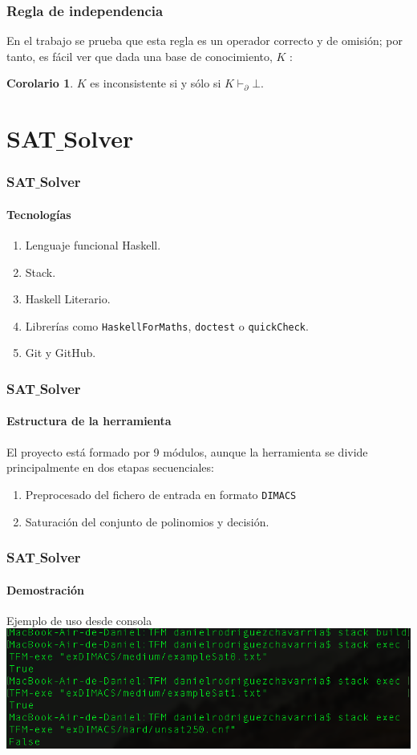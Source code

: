 \documentclass[12pt,a4paper]{beamer}
\theoremstyle{definition}
\newtheorem{cor}[thm]{Corolario}
\theoremstyle{remark}
\begin{document}
\begin{frame}
\frametitle{Regla de independencia}
En el trabajo se prueba que esta regla es un operador correcto y de omisión; por tanto, es fácil ver que dada una base de conocimiento, $K$ :\\
\vspace{0.5cm}

\begin{cor}
$K$ es inconsistente si y sólo si $K\vdash_{\partial} \bot$.
\end{cor}
\end{frame}

\section{SAT$\_$Solver}
\begin{frame}
\frametitle{SAT$\_$Solver}
\framesubtitle{Tecnologías}
\begin{enumerate}
\item Lenguaje funcional Haskell.
\item Stack.
\item Haskell Literario.
\item Librerías como \texttt{HaskellForMaths}, \texttt{doctest} o \texttt{quickCheck}.
\item Git y GitHub.
\end{enumerate}
\end{frame}

\begin{frame}
\frametitle{SAT$\_$Solver}
\framesubtitle{Estructura de la herramienta}
El proyecto está formado por 9 módulos, aunque la herramienta se divide principalmente en dos etapas secuenciales:
\begin{enumerate}
\item Preprocesado del fichero de entrada en formato \texttt{DIMACS}
\item Saturación del conjunto de polinomios y decisión.
\end{enumerate}
\end{frame}

\begin{frame}
\frametitle{SAT$\_$Solver}
\framesubtitle{Demostración}
\begin{center}
\Large{Ejemplo de uso desde consola}\\
\vspace{0.5cm}
\includegraphics[scale=0.37]{imagenes/example.png}
\end{center}
\end{frame}
\end{document}

